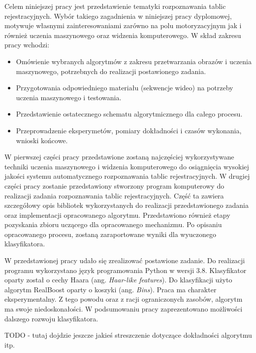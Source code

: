 Celem niniejszej pracy jest przedstawienie tematyki rozpoznawania tablic rejestracyjnych.
Wybór takiego zagadnienia w niniejszej pracy dyplomowej, motywuje własnymi zainteresowaniami zarówno na polu motoryzacyjnym jak i również uczenia maszynowego oraz widzenia komputerowego.
W skład zakresu pracy wchodzi:
\begin{itemize}
    \item Omówienie wybranych algorytmów z zakresu przetwarzania obrazów i uczenia maszynowego, potrzebnych
    do realizacji postawionego zadania.
    \item Przygotowania odpowiedniego materiału (sekwencje wideo) na potrzeby uczenia maszynowego i testowania.
    \item Przedstawienie ostatecznego schematu algorytmicznego dla całego procesu.
    \item Przeprowadzenie eksperymetów, pomiary dokładności i czasów wykonania, wnioski końcowe.
\end{itemize}

W pierwszej części pracy przedstawione zostaną najczęściej wykorzystywane techniki uczenia maszynowego i widzenia komputerowego do osiągnięcia wysokiej jakości systemu automatycznego rozpoznawania tablic rejestracyjnych.
W drugiej części pracy zostanie przedstawiony stworzony program komputerowy do realizacji zadania rozpoznawania tablic rejestracyjnych.
Część ta zawiera szczegółowy opis bibliotek wykorzystanych do realizacji przedstawionego zadania oraz implementacji opracowanego algorytmu.
Przedstawiono również etapy pozyskania zbioru uczącego dla opracowanego mechanizmu.
Po opisaniu opracowanego procesu, zostaną zaraportowane wyniki dla wyuczonego klasyfikatora.

W przedstawionej pracy udało się zrealizować postawione zadanie.
Do realizacji programu wykorzystano język programowania Python w wersji 3.8.
Klasyfikator oparty został o cechy Haara (ang. \textit{Haar-like features}).
Do klasyfikacji użyto algorytm RealBoost oparty o koszyki (ang. \textit{Bins}).
Praca ma charakter eksperymentalny.
Z tego powodu oraz z racji ograniczonych zasobów, algorytm ma swoje niedoskonałości.
W podsumowaniu pracy zaprezentowano możliwości dalszego rozwoju klasyfikatora.

TODO - tutaj dojdzie jeszcze jakieś streszczenie dotyczące dokładności algorytmu itp.